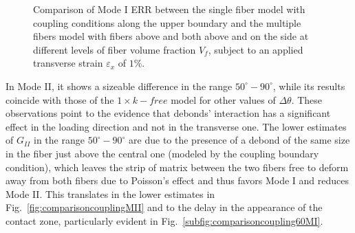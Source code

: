 \documentclass[review]{elsarticle}
\begin{document}
\begin{figure}[!h]
\caption{Comparison of Mode I ERR between the single fiber model with coupling conditions along the upper boundary and the multiple fibers model with fibers above and both above and on the side at different levels of fiber volume fraction $V_{f}$, subject to an applied transverse strain $\varepsilon_{x}$ of $1\%$.}\label{fig:comparisoncouplingMI}
\end{figure}

In Mode II, it shows a sizeable difference in the range $50^{\circ}-90^{\circ}$, while its results coincide with those of the $1\times k-free$ model for other values of $\Delta\theta$. These observations point to the evidence that debonds' interaction has a significant effect in the loading direction and not in the transverse one. The lower estimates of $G_{II}$ in the range  $50^{\circ}-90^{\circ}$ are due to the presence of a debond of the same size in the fiber just above the central one (modeled by the coupling boundary condition), which leaves the strip of matrix between the two fibers free to deform away from both fibers due to Poisson's effect and thus favors Mode I and reduces Mode II. This translates in the lower estimates in Fig.~\ref{fig:comparisoncouplingMII} and to the delay in the appearance of the contact zone, particularly evident in Fig.~\ref{subfig:comparisoncoupling60MI}.
\end{document}
